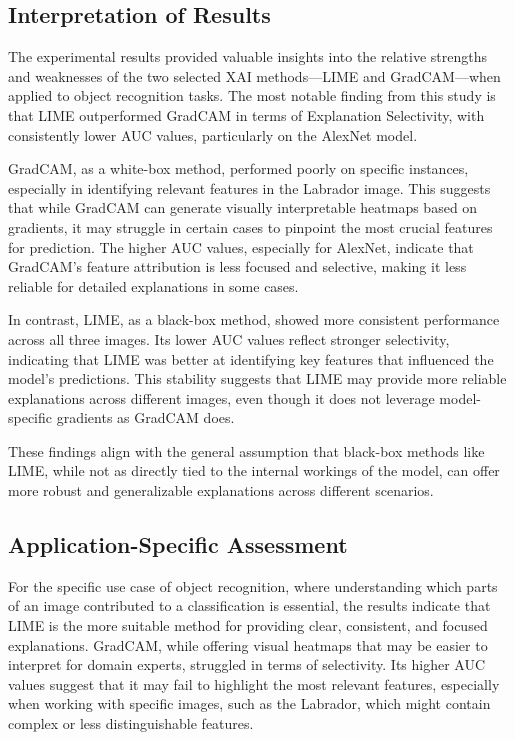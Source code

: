 \documentclass{article}
\begin{document}
\subsection{Interpretation of Results}
The experimental results provided valuable insights into the relative strengths and weaknesses of the two selected XAI methods—LIME and GradCAM—when applied to object recognition tasks. The most notable finding from this study is that LIME outperformed GradCAM in terms of Explanation Selectivity, with consistently lower AUC values, particularly on the AlexNet model.

GradCAM, as a white-box method, performed poorly on specific instances, especially in identifying relevant features in the Labrador image. This suggests that while GradCAM can generate visually interpretable heatmaps based on gradients, it may struggle in certain cases to pinpoint the most crucial features for prediction. The higher AUC values, especially for AlexNet, indicate that GradCAM’s feature attribution is less focused and selective, making it less reliable for detailed explanations in some cases.

In contrast, LIME, as a black-box method, showed more consistent performance across all three images. Its lower AUC values reflect stronger selectivity, indicating that LIME was better at identifying key features that influenced the model’s predictions. This stability suggests that LIME may provide more reliable explanations across different images, even though it does not leverage model-specific gradients as GradCAM does.

These findings align with the general assumption that black-box methods like LIME, while not as directly tied to the internal workings of the model, can offer more robust and generalizable explanations across different scenarios.


\subsection{Application-Specific Assessment}
For the specific use case of object recognition, where understanding which parts of an image contributed to a classification is essential, the results indicate that LIME is the more suitable method for providing clear, consistent, and focused explanations. GradCAM, while offering visual heatmaps that may be easier to interpret for domain experts, struggled in terms of selectivity. Its higher AUC values suggest that it may fail to highlight the most relevant features, especially when working with specific images, such as the Labrador, which might contain complex or less distinguishable features.
\end{document}
